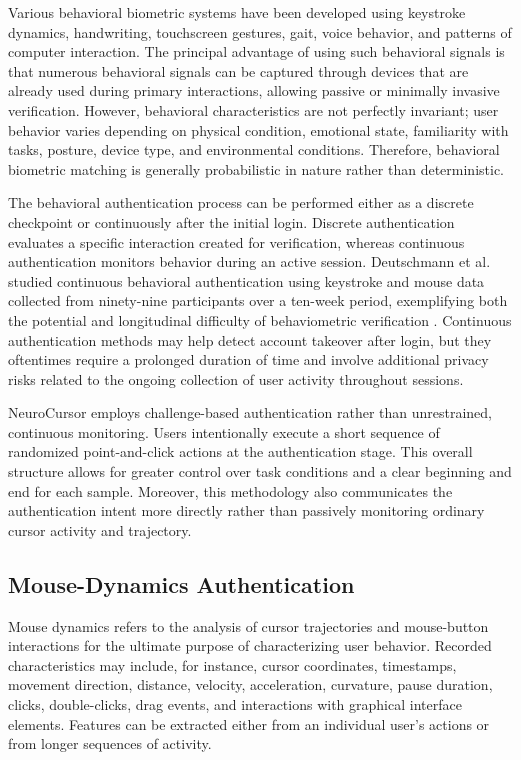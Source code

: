 \documentclass[conference]{IEEEtran}
\begin{document}
Various behavioral biometric systems have been developed using keystroke dynamics, handwriting, touchscreen gestures, gait, voice behavior, and patterns of computer interaction. The principal advantage of using such behavioral signals is that numerous behavioral signals can be captured through devices that are already used during primary interactions, allowing passive or minimally invasive verification. However, behavioral characteristics are not perfectly invariant; user behavior varies depending on physical condition, emotional state, familiarity with tasks, posture, device type, and environmental conditions. Therefore, behavioral biometric matching is generally probabilistic in nature rather than deterministic. 

The behavioral authentication process can be performed either as a discrete checkpoint or continuously after the initial login. Discrete authentication evaluates a specific interaction created for verification, whereas continuous authentication monitors behavior during an active session. Deutschmann et al. studied continuous behavioral authentication using keystroke and mouse data collected from ninety-nine participants over a ten-week period, exemplifying both the potential and longitudinal difficulty of behaviometric verification \cite{deutschmannContinuousAuthentication}. Continuous authentication methods may help detect account takeover after login, but they oftentimes require a prolonged duration of time and involve additional privacy risks related to the ongoing collection of user activity throughout sessions. 

NeuroCursor employs challenge-based authentication rather than unrestrained, continuous monitoring. Users intentionally execute a short sequence of randomized point-and-click actions at the authentication stage. This overall structure allows for  greater control over task conditions and a clear beginning and end for each sample. Moreover, this methodology also communicates the authentication intent more directly rather than passively monitoring ordinary cursor activity and trajectory. 

\subsection{Mouse-Dynamics Authentication}

Mouse dynamics refers to the analysis of cursor trajectories and mouse-button interactions for the ultimate purpose of characterizing user behavior. Recorded characteristics may include, for instance, cursor coordinates, timestamps, movement direction, distance, velocity, acceleration, curvature, pause duration, clicks, double-clicks, drag events, and interactions with graphical interface elements. Features can be extracted either from an individual user's actions or from longer sequences of activity. 
\end{document}
